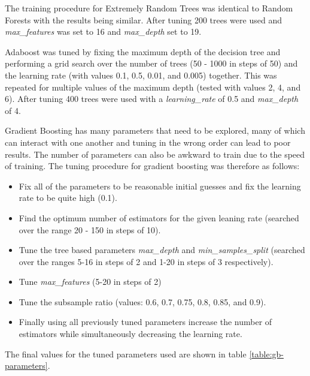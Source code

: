 \documentclass[journal]{IEEEtran}
\begin{document}
The training procedure for Extremely Random Trees was identical to Random Forests with the results being similar. After tuning 200 trees were used and \textit{max\_features} was set to 16 and \textit{max\_depth} set to 19.

Adaboost was tuned by fixing the maximum depth of the decision tree and performing a grid search over the number of trees (50 - 1000 in steps of 50) and the learning rate (with values 0.1, 0.5, 0.01, and 0.005) together. This was repeated for multiple values of the maximum depth (tested with values 2, 4, and 6). After tuning 400 trees were used with a \textit{learning\_rate} of 0.5 and \textit{max\_depth} of 4.

Gradient Boosting has many parameters that need to be explored, many of which can interact with one another and tuning in the wrong order can lead to poor results. The number of parameters can also be awkward to train due to the speed of training. The tuning procedure for gradient boosting was therefore as follows:

\begin{itemize}
	\item Fix all of the parameters to be reasonable initial guesses and fix the learning rate to be quite high (0.1).
	\item Find the optimum number of estimators for the given leaning rate (searched over the range 20 - 150 in steps of 10).
	\item Tune the tree based parameters \textit{max\_depth} and \textit{min\_samples\_split} (searched over the ranges 5-16 in steps of 2 and 1-20 in steps of 3 respectively).
	\item Tune \textit{max\_features} (5-20 in steps of 2)
	\item Tune the subsample ratio (values: 0.6, 0.7, 0.75, 0.8, 0.85, and 0.9).
	\item Finally using all previously tuned parameters increase the number of estimators while simultaneously decreasing the learning rate.
\end{itemize}

The final values for the tuned parameters used are shown in table \ref{table:gb-parameters}.
\end{document}

